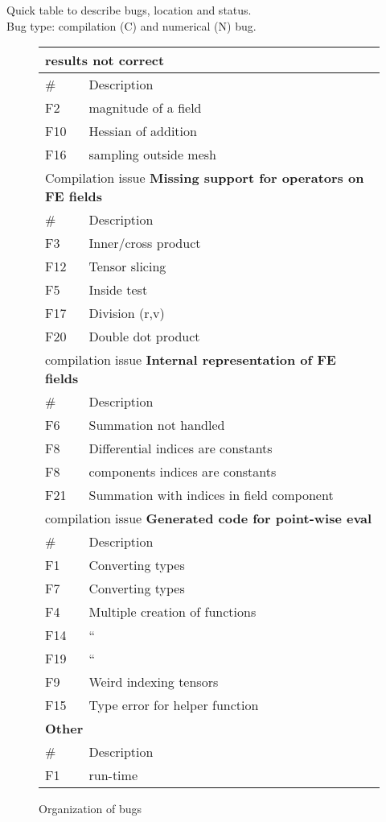 \documentclass{article}
\begin{document}
Quick table to describe bugs, location and status.\\
Bug type: compilation (C) and numerical (N) bug.\\


\begin{figure}
\begin{tabular}{|l|l|} 
\hline
\multicolumn{2}{|l|}{\textbf{results not correct}}\\
\hline
\# &Description \\
\hline
 F2   & magnitude of a field\\
 F10   &  Hessian of addition \\
   F16    & sampling outside mesh  \\
\hline
\hline
\multicolumn{2}{|l|}{Compilation issue \textbf{ Missing support for operators on FE fields}}\\
\hline
\# & Description \\
\hline
 F3 & Inner/cross product \\
F12 & Tensor slicing\\
   F5 &Inside test\\
F17  &   Division (r,v)\\
  F20  & Double dot product\\
\hline  
\hline
\multicolumn{2}{|l|}{ compilation issue \textbf{ Internal representation of FE fields}}\\
\hline
\# & Description \\
\hline
 F6   & Summation not handled \\
  F8  & Differential indices are constants\\
    F8  &components indices are constants\\
F21  &Summation with indices in field component\\
\hline    
\hline
\multicolumn{2}{|l|}{compilation issue \textbf{Generated code for point-wise eval}}\\
\hline
\# & Description \\
\hline
 F1 &Converting types\\
F7  & Converting types\\
 F4   &Multiple creation of functions  \\
F14   & ``\\
F19   & ``\\
   F9  &   Weird indexing tensors\\
 F15  &  Type error for helper function\\
\hline  
\hline
\multicolumn{2}{|l|}{\textbf{Other}}\\
\hline
\# & Description \\
\hline
  F1   &run-time\\
\hline
\end{tabular}
\caption{Organization of bugs}
\label{bugs}
\end{figure}
\end{document}
